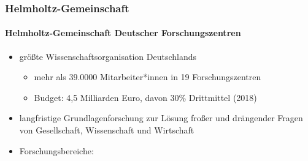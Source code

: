 \documentclass[10pt,t]{beamer}
\begin{document}
\begin{frame}
\frametitle{Helmholtz-Gemeinschaft}
\framesubtitle{Helmholtz-Gemeinschaft Deutscher Forschungszentren}
\vspace*{-1.5\baselineskip}
\begin{itemize}
    \item größte Wissenschaftsorganisation Deutschlands
    \begin{itemize}
        \item mehr als 39.0000 Mitarbeiter*innen in 19 Forschungszentren
        \item Budget: 4,5 Milliarden Euro, davon 30\% Drittmittel (2018)
    \end{itemize}
    \item langfristige Grundlagenforschung zur Lösung froßer und drängender Fragen von Gesellschaft, Wissenschaft und Wirtschaft
    \item Forschungsbereiche:
\end{itemize}


\end{frame}
\end{document}
